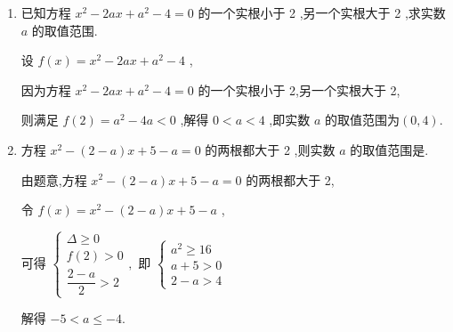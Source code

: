 \begin{enumerate}
\begin{jieda}
        而函数 $f\left( x\right)$ 图象开口向上,因此 $f\left( 1\right)  < 0$ ,则 ${1}^{2} + \left( {{3a} - 1}\right)  \times  1 + a + 8 < 0$ ,解得 $a <  - 2$，所以实数 $a$ 的取值范围为 $a <  - 2$
    \end{jieda}
    \item 已知方程 ${x}^{2} - {2ax} + {a}^{2} - 4 = 0$ 的一个实根小于 2 ,另一个实根大于 2 ,求实数 $a$ 的取值范围.
    \begin{jieda}
        设 $f\left( x\right)  = {x}^{2} - {2ax} + {a}^{2} - 4$ ,
        
        因为方程 ${x}^{2} - {2ax} + {a}^{2} - 4 = 0$ 的一个实根小于 2,另一个实根大于 2,
        
        则满足 $f\left( 2\right)  = {a}^{2} - {4a} < 0$ ,解得 $0 < a < 4$ ,即实数 $a$ 的取值范围为$(0,4)$.
    \end{jieda}
    \item 方程 ${x}^{2} - \left( {2 - a}\right) x + 5 - a = 0$ 的两根都大于 2 ,则实数 $a$ 的取值范围是\blkda[4]{$(- 5,-4]$}.
    \begin{jieda}
        由题意,方程 ${x}^{2} - \left( {2 - a}\right) x + 5 - a = 0$ 的两根都大于 2,
        
        令 $f\left( x\right)  = {x}^{2} - \left( {2 - a}\right) x + 5 - a$ ,
        
        可得 $\left\{  {\begin{matrix} \Delta  \geq  0 \\  f\left( 2\right)  > 0 \\  \dfrac{2 - a}{2} > 2 \end{matrix},\text{ 即 }\left\{  \begin{matrix} {a}^{2} \geq  {16} \\  a + 5 > 0 \\  2 - a > 4 \end{matrix}\right. }\right.$

        解得  $- 5 < a \leq   - 4$.
    \end{jieda}
    
\end{enumerate}
